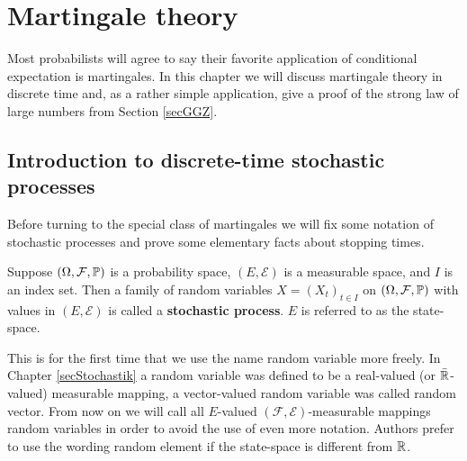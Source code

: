 \chapter{Martingale theory}
	\marginpar{\textcolor{red}{Lecture 4}}


Most probabilists will agree to say their favorite  application of conditional expectation is martingales. In this chapter we will discuss martingale theory in discrete time and, as a rather simple application, give a proof of the strong law of large numbers from Section \ref{secGGZ}.

\section{Introduction to discrete-time stochastic processes}
Before turning to the special class of martingales we will fix some notation of stochastic processes and prove some elementary facts about stopping times.

\begin{ldef}
\begin{deff}\label{Def_sto_process}
	Suppose $(\Omega,\mathcal{F},\mathbb{P})$ is a probability space, $( E,\mathcal E )$ is a measurable space, and $I$ is an index set. Then a  family of random variables $X=(X_t)_{t \in I}$ on $( \Omega,\mathcal{F},\mathbb{P} )$ with values in $( E,\mathcal E )$ is called a \textbf{stochastic process}. $E$ is referred to as the state-space.
\end{deff}	
\end{ldef}
This is for the first time that we use the name random variable more freely. In Chapter \ref{secStochastik} a random variable was defined to be a real-valued (or $\bar {\mathbb{R}}$-valued) measurable mapping, a vector-valued random variable was called random vector. From now on we will call all $E$-valued $(\mathcal F, \mathcal E)$-measurable mappings random variables in order to avoid the use of even more notation. Authors prefer to use the wording random element if the state-space is different from $\mathbb{R}$. \smallskip

